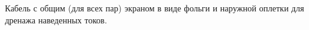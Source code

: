Кабель с общим (для всех пар) экраном в виде фольги и наружной
оплетки для дренажа наведенных токов.